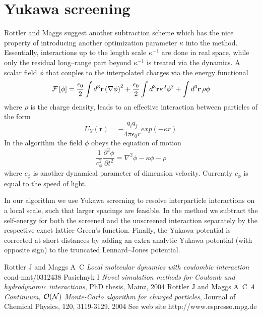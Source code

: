\documentclass[a4paper, 12pt]{article}
\newcommand{\vect}[1]{\mathbf{#1}}
\begin{document}
\section{Yukawa screening}
%
Rottler and Maggs \cite{maggs_prl_2} suggest another subtraction
scheme which has the nice property of introducing another optimization
parameter $\kappa$ into the method. Essentially, interactions up to
the length scale $\kappa^{-1}$ are done in real space, while only the
residual long--range part beyond $\kappa^{-1}$ is treated via the
dynamics. A scalar field $\phi$ that couples to the interpolated charges via the energy functional
%
\begin{equation}
{\cal F}\left[\phi\right]= \frac{\epsilon_0}{2} \int d^3 \vect r\left( \vect{\nabla} \phi \right)^2
+ \frac{\epsilon_0}{2} \int d^3 \vect r \kappa^2 \phi^2 + \int d^3 \vect r \, \rho \phi
\end{equation}
%
where $\rho$ is the charge density, leads to an effective interaction between particles of the form
%
\begin{equation}
  U_Y(\vect r)=-\frac{q_iq_j}{4\pi\epsilon_0 r}exp(-\kappa r)
\end{equation}
%
In the algorithm the field $\phi$ obeys the equation of motion
%
\begin{equation}
  \frac{1}{c_{\phi}^2}\frac{\partial^2\phi}{\partial t^2}=\nabla^2\phi-\kappa\phi-\rho
\end{equation}
%
where $c_{\phi}$ is another dynamical parameter of dimension velocity. Currently $c_{\phi}$ is equal to the speed of light. 

In our algorithm we use Yukawa screening to resolve interparticle
interactions on a local scale, such that larger spacings are
feasible. In the method we subtract the self-energy for both the
screened and the unscreened interaction separately by the respective
exact lattice Green's function.  Finally, the Yukawa potential is
corrected at short distances by adding an extra analytic Yukawa
potential (with opposite sign) to the truncated Lennard--Jones
potential.

\begin{thebibliography}{10}

Rottler J and Maggs A~C \emph{Local molecular dynamics with coulombic
  interaction} cond-mat/0312438
Pasichnyk I \emph{Novel simulation methods for Coulomb and hydrodynamic interactions}, PhD thesis, Mainz, 2004
Rottler J and Maggs A~C \emph{A Continuum, {$\cal O(N)$} Monte-Carlo algorithm for charged particles}, Journal of Chemical Physics, 120, 3119-3129, 2004
See web site http://www.espresso.mpg.de
\end{thebibliography}
\end{document}
